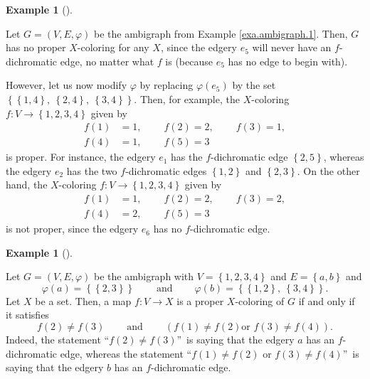 \documentclass[numbers=enddot,12pt,final,onecolumn,notitlepage]{scrartcl}%
\theoremstyle{definition}
\newtheorem{exmp}[theo]{Example}
\newenvironment{example}[1][]
{\begin{exmp}[#1]\begin{leftbar}}
{\end{leftbar}\end{exmp}}
\begin{document}
\begin{example}
\label{exa.ambigraph.coloring.1}Let $G=\left(  V,E,\varphi\right)  $ be the
ambigraph from Example \ref{exa.ambigraph.1}. Then, $G$ has no proper
$X$-coloring for any $X$, since the edgery $e_{5}$ will never have an
$f$-dichromatic edge, no matter what $f$ is (because $e_{5}$ has no edge to
begin with).

However, let us now modify $\varphi$ by replacing $\varphi\left(
e_{5}\right)  $ by the set $\left\{  \left\{  1,4\right\}  ,\ \left\{
2,4\right\}  ,\ \left\{  3,4\right\}  \right\}  $. Then, for example, the
$X$-coloring $f:V\rightarrow\left\{  1,2,3,4\right\}  $ given by%
\begin{align*}
f\left(  1\right)   &  =1,\ \ \ \ \ \ \ \ \ \ f\left(  2\right)
=2,\ \ \ \ \ \ \ \ \ \ f\left(  3\right)  =1,\\
f\left(  4\right)   &  =1,\ \ \ \ \ \ \ \ \ \ f\left(  5\right)  =3
\end{align*}
is proper. For instance, the edgery $e_{1}$ has the $f$-dichromatic edge
$\left\{  2,5\right\}  $, whereas the edgery $e_{2}$ has the two
$f$-dichromatic edges $\left\{  1,2\right\}  $ and $\left\{  2,3\right\}  $.
On the other hand, the $X$-coloring $f:V\rightarrow\left\{  1,2,3,4\right\}  $
given by%
\begin{align*}
f\left(  1\right)   &  =1,\ \ \ \ \ \ \ \ \ \ f\left(  2\right)
=2,\ \ \ \ \ \ \ \ \ \ f\left(  3\right)  =2,\\
f\left(  4\right)   &  =2,\ \ \ \ \ \ \ \ \ \ f\left(  5\right)  =3
\end{align*}
is not proper, since the edgery $e_{6}$ has no $f$-dichromatic edge.
\end{example}

\begin{example}
\label{exa.ambigraph.coloring.2}Let $G=\left(  V,E,\varphi\right)  $ be the
ambigraph with $V=\left\{  1,2,3,4\right\}  $ and $E=\left\{  a,b\right\}  $
and%
\[
\varphi\left(  a\right)  =\left\{  \left\{  2,3\right\}  \right\}
\ \ \ \ \ \ \ \ \ \ \text{and}\ \ \ \ \ \ \ \ \ \ \varphi\left(  b\right)
=\left\{  \left\{  1,2\right\}  ,\ \left\{  3,4\right\}  \right\}  .
\]
Let $X$ be a set. Then, a map $f:V\rightarrow X$ is a proper $X$-coloring of
$G$ if and only if it satisfies%
\[
f\left(  2\right)  \neq f\left(  3\right)  \ \ \ \ \ \ \ \ \ \ \text{and}%
\ \ \ \ \ \ \ \ \ \ \left(  f\left(  1\right)  \neq f\left(  2\right)  \text{
or }f\left(  3\right)  \neq f\left(  4\right)  \right)  .
\]
Indeed, the statement \textquotedblleft$f\left(  2\right)  \neq f\left(
3\right)  $\textquotedblright\ is saying that the edgery $a$ has an
$f$-dichromatic edge, whereas the statement \textquotedblleft$f\left(
1\right)  \neq f\left(  2\right)  $ or $f\left(  3\right)  \neq f\left(
4\right)  $\textquotedblright\ is saying that the edgery $b$ has an
$f$-dichromatic edge.
\end{example}
\end{document}
